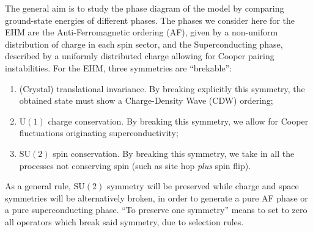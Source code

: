 The general aim is to study the phase diagram of the model by comparing ground-state energies of different phases. The phases we consider here for the EHM are the Anti-Ferromagnetic ordering (AF), given by a non-uniform distribution of charge in each spin sector, and the Superconducting phase, described by a uniformly distributed charge allowing for Cooper pairing instabilities. For the EHM, three symmetries are ``brekable'':
\begin{enumerate}
	\item (Crystal) translational invariance. By breaking explicitly this symmetry, the obtained state must show a Charge-Density Wave (CDW) ordering;
	\item $\mathrm{U}(1)$ charge conservation. By breaking this symmetry, we allow for Cooper fluctuations originating superconductivity;
	\item $\mathrm{SU}(2)$ spin conservation. By breaking this symmetry, we take in all the processes not conserving spin (such as site hop \textit{plus} spin flip).
\end{enumerate}
As a general rule, $\mathrm{SU}(2)$ symmetry will be preserved while charge and space symmetries will be alternatively broken, in order to generate a pure AF phase or a pure superconducting phase. ``To preserve one symmetry'' means to set to zero all operators which break said symmetry, due to selection rules.

